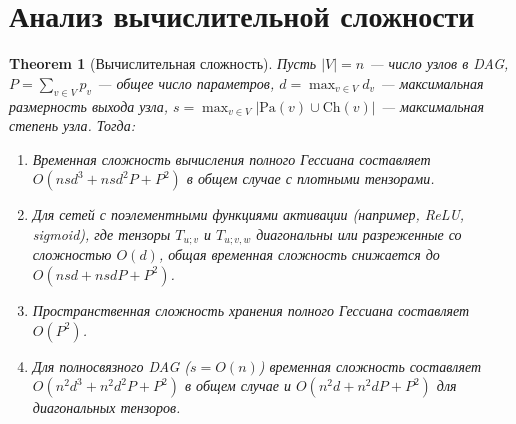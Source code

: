 \documentclass[11pt]{article}
\newtheorem{theorem}{Theorem}
\newcommand{\Pa}{\mathrm{Pa}} %
\newcommand{\Ch}{\mathrm{Ch}} %
\begin{document}
\section{Анализ вычислительной сложности}

\begin{theorem}[Вычислительная сложность]
  Пусть $|V|=n$ — число узлов в DAG, $P = \sum_{v \in V} p_v$ — общее число параметров, $d = \max_{v \in V}
  d_v$ — максимальная размерность выхода узла, $s = \max_{v \in V} |\Pa(v) \cup \Ch(v)|$ — максимальная
  степень узла. Тогда:

  \begin{enumerate}
    \item Временная сложность вычисления полного Гессиана составляет $O(n s d^3 + n s d^2 P + P^2)$ в общем
      случае с плотными тензорами.
    \item Для сетей с поэлементными функциями активации (например, ReLU, sigmoid), где тензоры $T_{u;v}$ и
      $T_{u;v,w}$ диагональны или разреженные со сложностью $O(d)$, общая временная сложность снижается до
      $O(n s d + n s d P + P^2)$.
    \item Пространственная сложность хранения полного Гессиана составляет $O(P^2)$.
    \item Для полносвязного DAG ($s = O(n)$) временная сложность составляет $O(n^2 d^3 + n^2 d^2 P + P^2)$ в
      общем случае и $O(n^2 d + n^2 d P + P^2)$ для диагональных тензоров.
  \end{enumerate}
\end{theorem}
\end{document}
